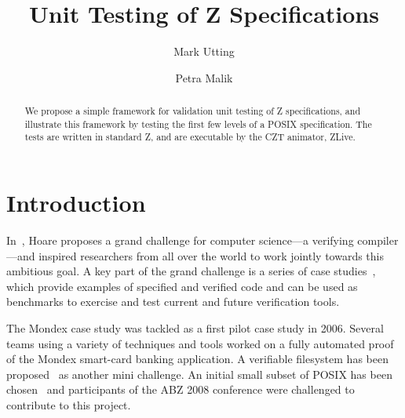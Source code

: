 \documentclass{llncs}
\begin{document}
\pagestyle{headings}  %
%
\title{Unit Testing of Z Specifications}
%
\author{Mark Utting \and Petra Malik}
%
%
%

\maketitle              %

\begin{abstract}
  We propose a simple framework for validation unit testing of Z
  specifications, and illustrate this framework by testing the first few
  levels of a POSIX specification.  The tests are written in standard Z,
  and are executable by the CZT animator, ZLive.
\end{abstract}

\section{Introduction}

In~\cite{Hoa03}, Hoare proposes a grand challenge for computer
science---a verifying compiler---and inspired researchers from all
over the world to work jointly towards this ambitious goal.  
A key part of the grand challenge is a series of case 
studies~\cite{BicHoaWoo06}, which
provide examples of specified and verified code and can
be used as benchmarks to exercise and test current and future
verification tools.

The Mondex case study was tackled as a first pilot case study in 2006.
Several teams using a variety of techniques and tools worked on
a fully automated proof of the Mondex smart-card banking application.
A verifiable filesystem has been proposed~\cite{JosHol07} as another
mini challenge.  An initial small subset of POSIX has been
chosen~\cite{FreFuWoo07} and participants of the ABZ 2008 conference
were challenged to contribute to this project.
\end{document}
